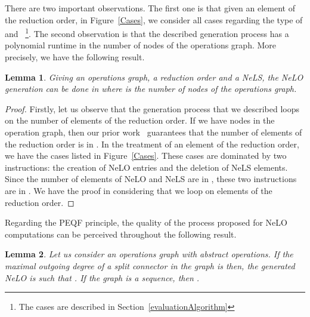 \documentclass[a4paper]{article}
\newtheorem{lemma}{Lemma}
\begin{document}
There are two important observations. The first one is that given an 
element  of the reduction order, in Figure~\ref{Cases}, we consider all cases regarding 
the type of  and ~\footnote{The cases are described in Section~\ref{evaluationAlgorithm}}. 
The second observation is that the described generation process has a polynomial runtime in the number of nodes 
of the operations graph. More precisely, we have the following result.

\begin{lemma}
Giving an operations graph, a reduction order and a NeLS, the NeLO generation can be 
done in  where  is the number of nodes of the operations graph. 
\end{lemma}

\begin{proof}
Firstly, let us observe that the generation process that we described loops on the number of 
elements of the reduction order. If we have  nodes in the operation graph, then our prior 
work~\cite{GoldmanNgoko} guarantees that the number of elements of the reduction order is in . 
In the treatment of an element of the reduction order, we have the cases listed in Figure~\ref{Cases}. 
These cases are dominated by two instructions: the creation of NeLO entries and the deletion of NeLS elements. 
Since the number of elements of NeLO and NeLS are in , these two instructions are in . 
We have the proof in considering that we loop on elements of the reduction order. 
\end{proof}


Regarding the PEQF principle, the quality of the process proposed for NeLO computations 
can be perceived throughout the following result. 

\begin{lemma}
Let us consider an operations graph with  abstract operations. If the maximal outgoing degree of 
a split connector in the graph is  then, the generated NeLO 
 is such that . If the graph is a sequence, then 
. 
\end{lemma}
\end{document}

